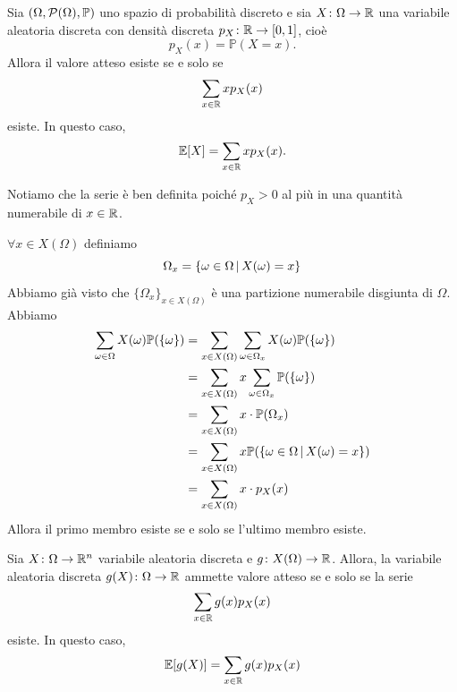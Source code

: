 \documentclass[a4paper]{article}
\begin{document}
\begin{snippetproposition}{}
    Sia \((\Omega, \mathcal P(\Omega), \mathbb P)\)
    uno spazio di probabilità discreto e sia
    \(X \colon \Omega \to \mathbb{R}\)
    una variabile aleatoria discreta con densità discreta
    \(p_X \colon \mathbb{R} \to [0,1]\), cioè
    \[
        p_X(x) = \mathbb P(X=x).
    \]
    Allora il valore atteso esiste se e solo se
    \[
        \sum_{x\in\mathbb{R}} x p_X(x)
    \]
    esiste. In questo caso,
    \[
        \mathbb E[X] = \sum_{x \in \mathbb{R}} x p_X(x).
    \]
\end{snippetproposition}

Notiamo che la serie è ben definita poiché \(p_X>0\) al più in una quantità numerabile di \(x\in \mathbb{R}\).

\begin{snippetproof}{}
    \(\forall x \in X(\Omega)\) definiamo
    \[
        \Omega_x = \{
            \omega \in \Omega \,|\, X(\omega) = x
        \}
    \]
    Abbiamo già visto che \(\{\Omega_x\}_{x\in X(\Omega)}\)
    è una partizione numerabile disgiunta di \(\Omega\). Abbiamo
    \begin{align*}
        \sum_{\omega \in \Omega} X(\omega) \mathbb P(\{\omega\})
        &= \sum_{x\in X(\Omega)} \sum_{\omega \in \Omega_x} X(\omega) \mathbb P(\{\omega\}) \\
        &= \sum_{x\in X(\Omega)} x \sum_{\omega\in \Omega_x} \mathbb P(\{\omega\}) \\
        &= \sum_{x\in X(\Omega)} x\cdot \mathbb P(\Omega_x) \\
        &= \sum_{x\in X(\Omega)} x \mathbb P(\{
                \omega \in \Omega \,|\, X(\omega) = x
        \}) \\
        &= \sum_{x\in X(\Omega)} x \cdot p_X(x)
    \end{align*}
    Allora il primo membro esiste se e solo se l'ultimo membro esiste.
\end{snippetproof}

\begin{snippetproposition}{}
    Sia \(X \colon \Omega \to \mathbb{R}^n\) variabile aleatoria discreta
    e \(g \colon X(\Omega) \to \mathbb{R}\).
    Allora, la variabile aleatoria discreta \(g(X) \colon \Omega \to \mathbb{R}\)
    ammette valore atteso se e solo se la serie
    \[
        \sum_{x\in\mathbb{R}} g(x) p_X(x)
    \]
    esiste.
    In questo caso, \[
        \mathbb E[g(X)] = \sum_{x \in \mathbb{R}}
        g(x) p_X(x)
    \]
\end{snippetproposition}
\end{document}

